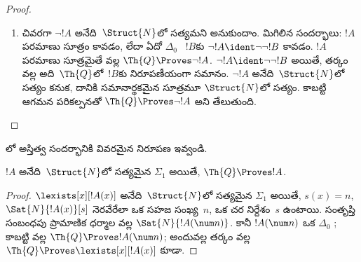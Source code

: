 \documentclass[../../../include/open-logic-section]{subfiles}
\begin{document}
\begin{proof}
\begin{enumerate}
అనుకుందాం; ఇక్కడ $t$ సంవృత పదం. ఈ , $\Th{Q}$లో
$\bforall{x<t}{\lnot !A(x)}$కు సమానం. కాబట్టి పరిమిత సార్వత్రిక
పరిమాణకాలకు ఇచ్చిన వాదనను వర్తింపజేయవచ్చు.
%
\item చివరగా $\lnot !A$ అనేది~$\Struct{N}$లో సత్యమని అనుకుందాం. మిగిలిన
సందర్భాలు: $!A$ పరమాణు సూత్రం కావడం, లేదా ఏదో $\Delta_0$ ~$!B$కు
$\lnot !A\ident\lnot\lnot !B$ కావడం. $!A$ పరమాణు సూత్రమైతే
 వల్ల $\Th{Q}\Proves\lnot !A$.
$\lnot !A\ident\lnot\lnot !B$ అయితే, తర్కం వల్ల అది~$\Th{Q}$లో~$!B$కు
నిరూపణీయంగా సమానం. $\lnot !A$ అనేది~$\Struct{N}$లో సత్యం కనుక, దానికి సమానార్థకమైన సూత్రమూ
$\Struct{N}$లో సత్యం. కాబట్టి ఆగమన పరికల్పనతో
$\Th{Q}\Proves\lnot !A$ అని తేలుతుంది.
\end{enumerate}
\end{proof}

\begin{prob}
లో అస్తిత్వ సందర్భానికి వివరమైన నిరూపణ ఇవ్వండి.
\end{prob}

\begin{thm}
$!A$ అనేది~$\Struct{N}$లో సత్యమైన $\Sigma_1$  అయితే,
$\Th{Q}\Proves !A$.
\end{thm}

\begin{proof}
$\lexists[x][!A(x)]$ అనేది~$\Struct{N}$లో సత్యమైన $\Sigma_1$ 
అయితే, $s(x)=n$, $\Sat{N}{!A(x)}[s]$ నెరవేరేలా ఒక సహజ సంఖ్య~$n$, ఒక చర
నిర్దేశం~$s$ ఉంటాయి. సంతృప్తి సంబంధపు ప్రామాణిక ధర్మాల వల్ల
$\Sat{N}{!A(\num n)}$. కానీ $!A(\num n)$ ఒక $\Delta_0$ ; కాబట్టి
 వల్ల $\Th{Q}\Proves !A(\num n)$; అందువల్ల
తర్కం వల్ల $\Th{Q}\Proves\lexists[x][!A(x)]$ కూడా.
\end{proof}
\end{document}
